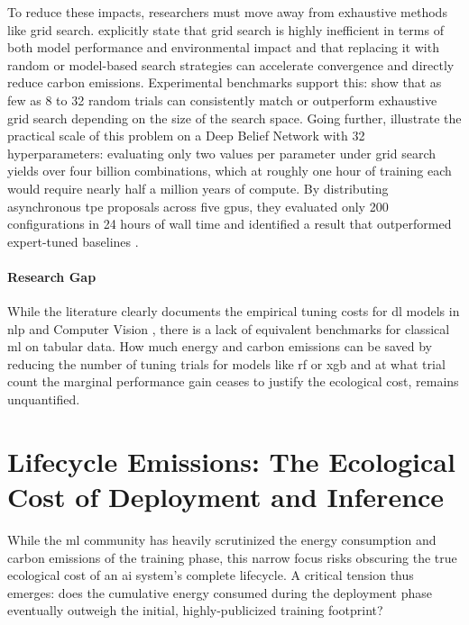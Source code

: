 To reduce these impacts, researchers must move away from exhaustive methods like grid search. \citeauthor{lacosteQuantifyingCarbonEmissions2019} \cite{lacosteQuantifyingCarbonEmissions2019} explicitly state that grid search is highly inefficient in terms of both model performance and environmental impact and that replacing it with random or model-based search strategies can accelerate convergence and directly reduce carbon emissions. Experimental benchmarks support this: \citeauthor{bergstraRandomSearchHyperParameter2012} \cite{bergstraRandomSearchHyperParameter2012} show that as few as 8 to 32 random trials can consistently match or outperform exhaustive grid search depending on the size of the search space. Going further, \citeauthor{bergstraAlgorithmsHyperParameterOptimization2011} \cite{bergstraAlgorithmsHyperParameterOptimization2011} illustrate the practical scale of this problem on a Deep Belief Network with 32 hyperparameters: evaluating only two values per parameter under grid search yields over four billion combinations, which at roughly one hour of training each would require nearly half a million years of compute. By distributing asynchronous \gls{tpe} proposals across five \glspl{gpu}, they evaluated only 200 configurations in 24 hours of wall time and identified a result that outperformed expert-tuned baselines \cite{bergstraAlgorithmsHyperParameterOptimization2011}.

\paragraph{Research Gap}
While the literature clearly documents the empirical tuning costs for \gls{dl} models in \gls{nlp} and Computer Vision \cite{strubellEnergyPolicyConsiderations2019a}, there is a lack of equivalent benchmarks for classical \gls{ml} on tabular data. How much energy and carbon emissions can be saved by reducing the number of tuning trials for models like \gls{rf} or \gls{xgb} and at what trial count the marginal performance gain ceases to justify the ecological cost, remains unquantified.

\section{Lifecycle Emissions: The Ecological Cost of Deployment and Inference}
\label{sec:related_inference}

While the \gls{ml} community has heavily scrutinized the energy consumption and carbon emissions of the training phase, this narrow focus risks obscuring the true ecological cost of an \gls{ai} system's complete lifecycle. A critical tension thus emerges: does the cumulative energy consumed during the deployment phase eventually outweigh the initial, highly-publicized training footprint?

